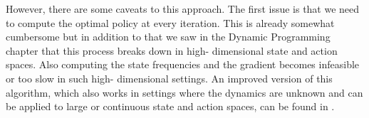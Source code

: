 However, there are some caveats to this approach. The first issue is that we need to compute the optimal policy at every iteration. This is 
already somewhat cumbersome but in addition to that we saw in the Dynamic Programming chapter that this process breaks down in high-
dimensional state and action spaces. Also computing the state frequencies and the gradient becomes infeasible or too slow in such high-
dimensional settings. An improved version of this algorithm, which also works in settings where the dynamics are unknown and can be applied 
to large or continuous state and action spaces, can be found in \cite{finn2016guidedcostlearningdeep}.

